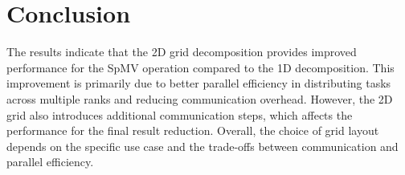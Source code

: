 \documentclass{article}
\begin{document}
\section{Conclusion}
The results indicate that the 2D grid decomposition provides improved performance for the SpMV operation compared to the 1D decomposition. This improvement is primarily due to better parallel efficiency in distributing tasks across multiple ranks and reducing communication overhead. However, the 2D grid also introduces additional communication steps, which affects the performance for the final result reduction. Overall, the choice of grid layout depends on the specific use case and the trade-offs between communication and parallel efficiency.
\end{document}
